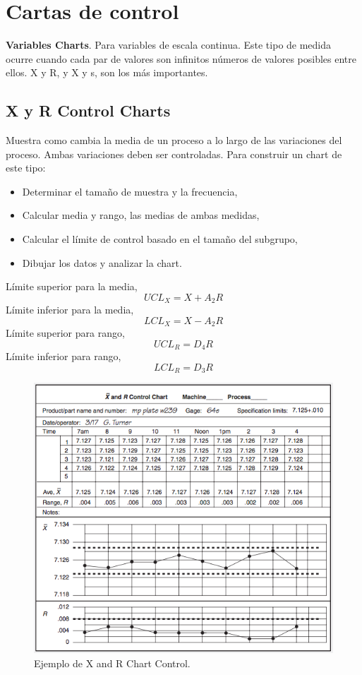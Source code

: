 \documentclass[oneside]{book}
\begin{document}
\section{Cartas de control}

\textbf{Variables Charts}. Para variables de escala continua. Este tipo de medida ocurre cuando cada par de valores son infinitos números de valores posibles entre ellos. X y R, y X y s, son los más importantes.

\subsection{X y R Control Charts}

Muestra como cambia la media de un proceso a lo largo de las variaciones del proceso. Ambas variaciones deben ser controladas. Para construir un chart de este tipo:
\begin{itemize}
	\item Determinar el tamaño de muestra y la frecuencia,
	\item Calcular media y rango, las medias de ambas medidas,
	\item Calcular el límite de control basado en el tamaño del subgrupo,
	\item Dibujar los datos y analizar la chart.
\end{itemize}
Límite superior para la media,
\begin{equation}
UCL_X = X + A_2R
\end{equation}
Límite inferior para la media,
\begin{equation}
LCL_X = X - A_2R
\end{equation}
Límite superior para rango,
\begin{equation}
UCL_R = D_4R
\end{equation}
Límite inferior para rango,
\begin{equation}
LCL_R = D_3R
\end{equation}

\begin{figure}[H]
	\centering
	\includegraphics[width=120mm]{imagenes/XandRControlEjemplo.png}
	\caption{Ejemplo de X and R Chart Control.}
	\label{fig:XandRControlEjemplo}
\end{figure}
\end{document}
